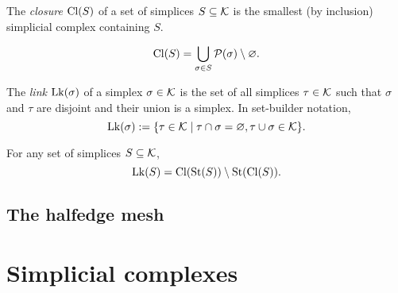 \begin{definition}\label{def:closure}
    The \emph{closure} $\operatorname{Cl}(S)$ of a set of simplices $S \subseteq \mathcal{K}$ is the smallest (by inclusion) simplicial complex containing $S$.
\end{definition}

\begin{lemma}\label{lem:closure_eq_down_closure}
    \[ \operatorname{Cl}(S) = \bigcup_{\sigma \in S} \mathcal{P}(\sigma) \setminus \varnothing. \] %
\end{lemma}

\begin{definition}\label{def:link}
    The \emph{link} $\operatorname{Lk}(\sigma)$ of a simplex $\sigma \in \mathcal{K}$ is the set of all simplices $\tau \in \mathcal{K}$ such that $\sigma$ and $\tau$ are disjoint and their union is a simplex. In set-builder notation,
    \[ \operatorname{Lk}(\sigma) := \{ \tau \in \mathcal{K} \mid \tau \cap \sigma = \varnothing, \tau \cup \sigma \in \mathcal{K} \}. \]
\end{definition}

\begin{lemma}\label{lem:lk_eq_cl_st_sub_st_cl}
    For any set of simplices $S \subseteq \mathcal{K}$, 
    \[ \operatorname{Lk}(S) = \operatorname{Cl}(\operatorname{St}(S)) \setminus \operatorname{St}(\operatorname{Cl}(S)). \]
\end{lemma}

\subsection{The halfedge mesh}
\label{ssec:halfedge_mesh}



\section{Simplicial complexes}
\label{sec:simplicial_complex}

